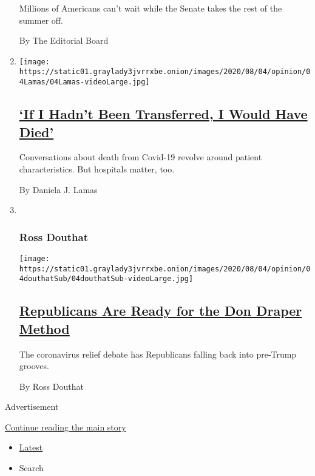 \begin{enumerate}
  Millions of Americans can't wait while the Senate takes the rest of
  the summer off.

  By The Editorial Board
\item
  \texttt{[image: https://static01.graylady3jvrrxbe.onion/images/2020/08/04/opinion/04Lamas/04Lamas-videoLarge.jpg]}

  \hypertarget{if-i-hadnt-been-transferred-i-would-have-died}{%
  \subsection{\texorpdfstring{\href{/2020/08/04/opinion/covid-rural-hospitals.html}{`If
  I Hadn't Been Transferred, I Would Have
  Died'}}{`If I Hadn't Been Transferred, I Would Have Died'}}\label{if-i-hadnt-been-transferred-i-would-have-died}}

  Conversations about death from Covid-19 revolve around patient
  characteristics. But hospitals matter, too.

  By Daniela J. Lamas
\item ~
  \hypertarget{ross-douthat}{%
  \subsubsection{Ross Douthat}\label{ross-douthat}}

  \texttt{[image: https://static01.graylady3jvrrxbe.onion/images/2020/08/04/opinion/04douthatSub/04douthatSub-videoLarge.jpg]}

  \hypertarget{republicans-are-ready-for-the-don-draper-method}{%
  \subsection{\texorpdfstring{\href{/2020/08/04/opinion/trump-republicans-tea-party.html}{Republicans
  Are Ready for the Don Draper
  Method}}{Republicans Are Ready for the Don Draper Method}}\label{republicans-are-ready-for-the-don-draper-method}}

  The coronavirus relief debate has Republicans falling back into
  pre-Trump grooves.

  By Ross Douthat
\end{enumerate}

Advertisement

\protect\hyperlink{after-mid1}{Continue reading the main story}

\begin{itemize}
\tightlist
\item
  \protect\hyperlink{stream-panel}{Latest}
\item
  Search
\end{itemize}

